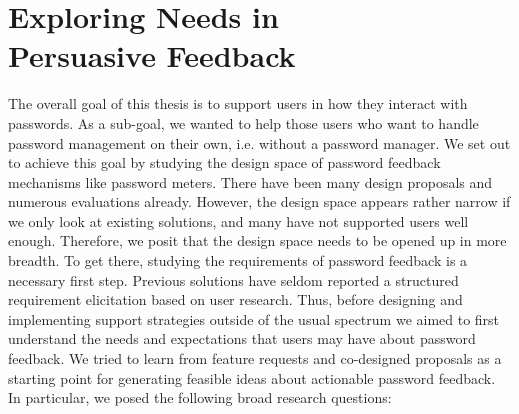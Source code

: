\chapter[Exploring Needs in Persuasive Feedback] {Exploring Needs in\\ Persuasive Feedback}\label{chap:feedback_modalities}




The overall goal of this thesis is to support users in how they interact with passwords. As a sub-goal, we wanted to help those users who want to handle password management on their own, i.e. without a password manager. We set out to achieve this goal by studying the design space of password feedback mechanisms like password meters. There have been many design proposals and numerous evaluations already. However, the design space appears rather narrow if we only look at existing solutions, and many have not supported users well enough. Therefore, we posit that the design space needs to be opened up in more breadth. To get there, studying the requirements of password feedback is a necessary first step. Previous solutions have seldom reported a structured requirement elicitation based on user research. Thus, before designing and implementing support strategies outside of the usual spectrum we aimed to first understand the needs and expectations that users may have about password feedback. We tried to learn from feature requests and co-designed proposals as a starting point for generating feasible ideas about actionable password feedback. In particular, we posed the following broad research questions:

